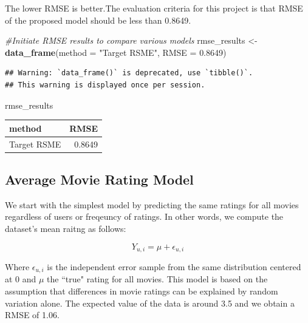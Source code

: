 \documentclass[]{article}
\newenvironment{Shaded}{\begin{snugshade}}{\end{snugshade}}
\newcommand{\CommentTok}[1]{\textcolor[rgb]{0.56,0.35,0.01}{\textit{#1}}}
\newcommand{\DataTypeTok}[1]{\textcolor[rgb]{0.13,0.29,0.53}{#1}}
\newcommand{\FloatTok}[1]{\textcolor[rgb]{0.00,0.00,0.81}{#1}}
\newcommand{\KeywordTok}[1]{\textcolor[rgb]{0.13,0.29,0.53}{\textbf{#1}}}
\newcommand{\NormalTok}[1]{#1}
\newcommand{\OperatorTok}[1]{\textcolor[rgb]{0.81,0.36,0.00}{\textbf{#1}}}
\newcommand{\StringTok}[1]{\textcolor[rgb]{0.31,0.60,0.02}{#1}}
\begin{document}
The lower RMSE is better.The evaluation criteria for this project is
that RMSE of the proposed model should be less than 0.8649.

\begin{Shaded}
\begin{Highlighting}[]
\CommentTok{#Initiate RMSE results to compare various models}
\NormalTok{rmse_results <-}\StringTok{ }\KeywordTok{data_frame}\NormalTok{(}\DataTypeTok{method =} \StringTok{"Target RSME"}\NormalTok{, }\DataTypeTok{RMSE =} \FloatTok{0.8649}\NormalTok{)}
\end{Highlighting}
\end{Shaded}

\begin{verbatim}
## Warning: `data_frame()` is deprecated, use `tibble()`.
## This warning is displayed once per session.
\end{verbatim}

\begin{Shaded}
\begin{Highlighting}[]
\NormalTok{rmse_results}
\end{Highlighting}
\end{Shaded}

\begin{longtable}[]{@{}lr@{}}
\toprule
method & RMSE\tabularnewline
\midrule
\endhead
Target RSME & 0.8649\tabularnewline
\bottomrule
\end{longtable}

\subsection{Average Movie Rating Model}
\label{sec:am}

We start with the simplest model by predicting the same ratings for all
movies regardless of users or freqeuncy of ratings. In other words, we
compute the dataset's mean raitng as follows:

\begin{equation}
Y_{u, i} = \mu + \epsilon_{u, i}
\end{equation}

Where \(\epsilon_{u,i}\) is the independent error sample from the same
distribution centered at 0 and \(\mu\) the ``true" rating for all
movies. This model is based on the assumption that differences in movie
ratings can be explained by random variation alone. The expected value
of the data is around 3.5 and we obtain a RMSE of 1.06.

\begin{Shaded}
\end{Shaded}
\end{document}

